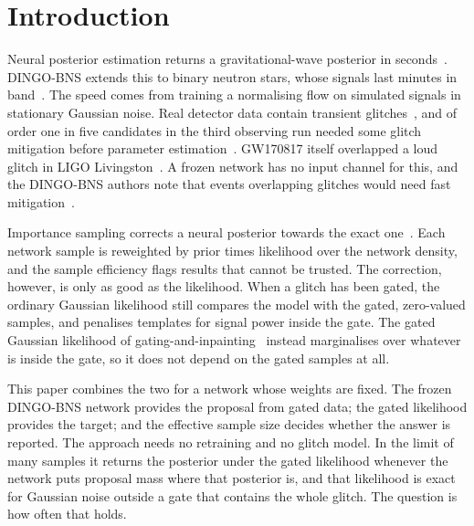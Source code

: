 \documentclass{openjournal}
\newcommand{\DINGOBNS}{DINGO-BNS\xspace}
\begin{document}
\section{Introduction}
\label{sec:intro}

Neural posterior estimation returns a gravitational-wave posterior in seconds~\cite{Cranmer2020sbi,Papamakarios2021review,Green2021npe,Dax2021dingo,Dax2022gnpe}.
\DINGOBNS extends this to binary neutron stars, whose signals last minutes in band~\cite{Dax2025bns}.
The speed comes from training a normalising flow on simulated signals in stationary Gaussian noise.
Real detector data contain transient glitches~\cite{Nuttall2018transient,Davis2021detchar,Glanzer2023gravityspy,Soni2025o4}, and of order one in five candidates in the third observing run needed some glitch mitigation before parameter estimation~\cite{Davis2022subtract}.
GW170817 itself overlapped a loud glitch in LIGO Livingston~\cite{Abbott2017gw170817,Pankow2018mitigation}.
A frozen network has no input channel for this, and the \DINGOBNS authors note that events overlapping glitches would need fast mitigation~\cite{Dax2025bns}.

Importance sampling corrects a neural posterior towards the exact one~\cite{Dax2023is}.
Each network sample is reweighted by prior times likelihood over the network density, and the sample efficiency flags results that cannot be trusted.
The correction, however, is only as good as the likelihood.
When a glitch has been gated, the ordinary Gaussian likelihood still compares the model with the gated, zero-valued samples, and penalises templates for signal power inside the gate.
The gated Gaussian likelihood of gating-and-inpainting~\cite{Zackay2021nongaussian,Capano2023multimode,Wang2025gating} instead marginalises over whatever is inside the gate, so it does not depend on the gated samples at all.

This paper combines the two for a network whose weights are fixed.
The frozen \DINGOBNS network provides the proposal from gated data; the gated likelihood provides the target; and the effective sample size decides whether the answer is reported.
The approach needs no retraining and no glitch model. In the limit of many samples it returns the posterior under the gated likelihood whenever the network puts proposal mass where that posterior is, and that likelihood is exact for Gaussian noise outside a gate that contains the whole glitch.
The question is how often that holds.
\end{document}
